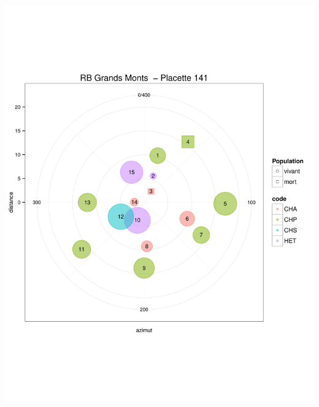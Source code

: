 \documentclass[a4paper]{book}\usepackage[]{graphicx}\usepackage[]{color}
\makeatletter
\def\maxwidth{ %
  \ifdim\Gin@nat@width>\linewidth
    \linewidth
  \else
    \Gin@nat@width
  \fi
}
\newenvironment{knitrout}{}{} %
\makeatother
\begin{document}
\begin{knitrout}
{\centering \includegraphics[width=\maxwidth]{Figures/PlanArbres-10} 

}





\end{knitrout}
\end{document}
